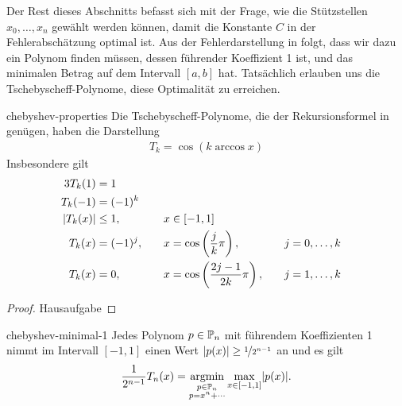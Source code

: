 \begin{intro}
  Der Rest dieses Abschnitts befasst sich mit der Frage, wie die
  Stützstellen $x_0,\dots,x_n$ gewählt werden können, damit die
  Konstante $C$ in der Fehlerabschätzung optimal ist.  Aus der
  Fehlerdarstellung in  folgt, dass
  wir dazu ein Polynom finden müssen, dessen führender Koeffizient 1
  ist, und das minimalen Betrag auf dem Intervall $[a,b]$ hat.
  Tatsächlich erlauben uns die Tschebyscheff-Polynome, diese
  Optimalität zu erreichen.
\end{intro}

\begin{Lemma}{chebyshev-properties}
  Die Tschebyscheff-Polynome, die der Rekursionsformel in
   genügen, haben die
  Darstellung
  \begin{gather}
    T_k = \cos(k \operatorname{arccos} x)
  \end{gather}
  Insbesondere gilt
  \begin{alignat}3
    T_k(1)&=1\\
    T_k(-1) &= (-1)^k\\
    \abs{T_k(x)} &\le 1, &\quad x&\in [-1,1]\\
    T_k(x) &=(-1)^j,
                   &\quad x&=\cos\left(\frac{j}{k}\pi\right),
                   &\quad j&=0,\dots,k\\
    T_k(x) &= 0,
             &\quad x&=\cos\left(\frac{2j-1}{2k}\pi\right),
             &\quad j&=1,\dots,k
  \end{alignat}
\end{Lemma}

\begin{proof}
  Hausaufgabe
\end{proof}

\begin{Satz}{chebyshev-minimal-1}
  Jedes Polynom $p\in \P_n$ mit führendem Koeffizienten 1 nimmt im
  Intervall $[-1,1]$ einen Wert $\abs{p(x)} \ge \nicefrac1{2^{n-1}}$
  an und es gilt
  \begin{gather}
   \frac1{2^{n-1}} T_n(x)
   = \operatorname*{arg min}_{\substack{p\in\P_n\\p = x^n+\cdots}}
   \max_{x\in[-1,1]}\abs{p(x)}.
  \end{gather}
\end{Satz}

